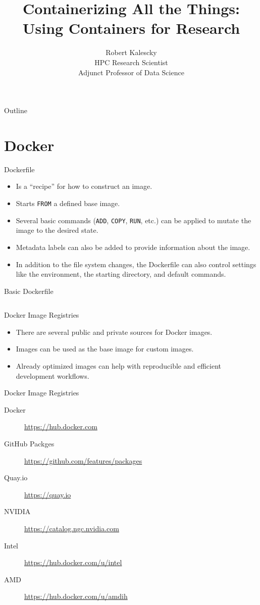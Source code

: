 \documentclass[aspectratio=169]{beamer}
\title{Containerizing All the Things: Using Containers for Research}
\author{Robert Kalescky\\HPC Research Scientist\\Adjunct Professor of Data Science}
\institute{
Research Technology Services\\
Office of Information Technology\\
Southern Methodist University}
\date{}
\begin{document}
\begin{frame}
\titlepage
\end{frame}

\begin{frame}{Outline}
\footnotesize
\tableofcontents
\end{frame}




\section{Docker}

\begin{frame}{Dockerfile}
\begin{itemize}
\item Is a ``recipe'' for how to construct an image.
\item Starts \texttt{FROM} a defined base image.
\item Several basic commands (\texttt{ADD}, \texttt{COPY},
\texttt{RUN}, etc.) can be applied to mutate the image to the desired
state.
\item Metadata labels can also be added to provide information about the image.
\item In addition to the file system changes, the Dockerfile can also control
settings like the environment, the starting directory, and default commands.
\end{itemize}
\end{frame}

\begin{frame}{Basic Dockerfile}
\inputminted{Dockerfile}{src/python3.dockerfile}
\end{frame}

\begin{frame}{Docker Image Registries}
\begin{itemize}
\item There are several public and private sources for Docker images.
\item Images can be used as the base image for custom images.
\item Already optimized images can help with reproducible and efficient
development workflows.
\end{itemize}
\end{frame}

\begin{frame}{Docker Image Registries}
\begin{description}
\item[Docker] \url{https://hub.docker.com}
\item[GitHub Packges] \url{https://github.com/features/packages}
\item[Quay.io] \url{https://quay.io}
\item[NVIDIA] \url{https://catalog.ngc.nvidia.com}
\item[Intel] \url{https://hub.docker.com/u/intel}
\item[AMD] \url{https://hub.docker.com/u/amdih}
\end{description}
\end{frame}
\end{document}
